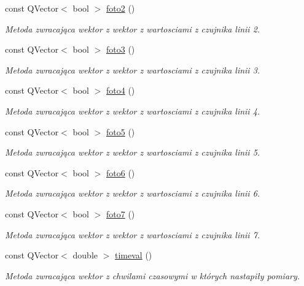 \begin{DoxyCompactItemize}
const Q\+Vector$<$ bool $>$ \hyperlink{data_8hh_afa951f0ad677779311df251fe92fbfe3}{foto2} ()
\begin{DoxyCompactList}\small\item\em Metoda zwracająca wektor z wektor z wartosciami z czujnika linii 2. \end{DoxyCompactList}\item 
const Q\+Vector$<$ bool $>$ \hyperlink{data_8hh_a4fecd44aa1e055d5450ee9434397547b}{foto3} ()
\begin{DoxyCompactList}\small\item\em Metoda zwracająca wektor z wektor z wartosciami z czujnika linii 3. \end{DoxyCompactList}\item 
const Q\+Vector$<$ bool $>$ \hyperlink{data_8hh_a1a3ca7f8af9fb4a232fe938f8386a434}{foto4} ()
\begin{DoxyCompactList}\small\item\em Metoda zwracająca wektor z wektor z wartosciami z czujnika linii 4. \end{DoxyCompactList}\item 
const Q\+Vector$<$ bool $>$ \hyperlink{data_8hh_acbcb97b2cb20774c8eac44bd006f338b}{foto5} ()
\begin{DoxyCompactList}\small\item\em Metoda zwracająca wektor z wektor z wartosciami z czujnika linii 5. \end{DoxyCompactList}\item 
const Q\+Vector$<$ bool $>$ \hyperlink{data_8hh_a9f7dba1f50ec0a2182ab565672939d7e}{foto6} ()
\begin{DoxyCompactList}\small\item\em Metoda zwracająca wektor z wektor z wartosciami z czujnika linii 6. \end{DoxyCompactList}\item 
const Q\+Vector$<$ bool $>$ \hyperlink{data_8hh_a2fdfb6294d83bfb2d9080c50fb8ecd57}{foto7} ()
\begin{DoxyCompactList}\small\item\em Metoda zwracająca wektor z wektor z wartosciami z czujnika linii 7. \end{DoxyCompactList}\item 
const Q\+Vector$<$ double $>$ \hyperlink{data_8hh_aa169e0d4f310b9042eaed9c52b2c807d}{timeval} ()
\begin{DoxyCompactList}\small\item\em Metoda zwracająca wektor z chwilami czasowymi w których nastapiły pomiary. \end{DoxyCompactList}\end{DoxyCompactItemize}
